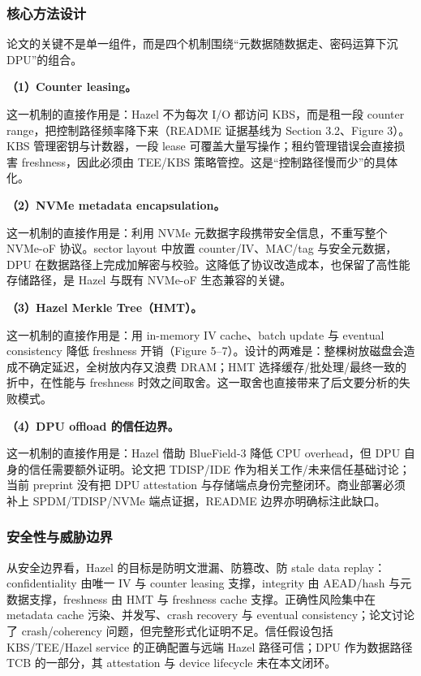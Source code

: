 \documentclass[11pt]{ctexart}
\begin{document}
\subsubsection{核心方法设计}
论文的关键不是单一组件，而是四个机制围绕“元数据随数据走、密码运算下沉 DPU”的组合。\par
\noindent\textbf{（1）Counter leasing。}\par
这一机制的直接作用是：Hazel 不为每次 I/O 都访问 KBS，而是租一段 counter range，把控制路径频率降下来（README 证据基线为 Section 3.2、Figure 3）。KBS 管理密钥与计数器，一段 lease 可覆盖大量写操作；租约管理错误会直接损害 freshness，因此必须由 TEE/KBS 策略管控。这是“控制路径慢而少”的具体化。\par
\noindent\textbf{（2）NVMe metadata encapsulation。}\par
这一机制的直接作用是：利用 NVMe 元数据字段携带安全信息，不重写整个 NVMe-oF 协议。sector layout 中放置 counter/IV、MAC/tag 与安全元数据，DPU 在数据路径上完成加解密与校验。这降低了协议改造成本，也保留了高性能存储路径，是 Hazel 与既有 NVMe-oF 生态兼容的关键。\par
\noindent\textbf{（3）Hazel Merkle Tree（HMT）。}\par
这一机制的直接作用是：用 in-memory IV cache、batch update 与 eventual consistency 降低 freshness 开销（Figure 5--7）。设计的两难是：整棵树放磁盘会造成不确定延迟，全树放内存又浪费 DRAM；HMT 选择缓存/批处理/最终一致的折中，在性能与 freshness 时效之间取舍。这一取舍也直接带来了后文要分析的失败模式。\par
\noindent\textbf{（4）DPU offload 的信任边界。}\par
这一机制的直接作用是：Hazel 借助 BlueField-3 降低 CPU overhead，但 DPU 自身的信任需要额外证明。论文把 TDISP/IDE 作为相关工作/未来信任基础讨论；当前 preprint 没有把 DPU attestation 与存储端点身份完整闭环。商业部署必须补上 SPDM/TDISP/NVMe 端点证据，README 边界亦明确标注此缺口。\par
\subsubsection{安全性与威胁边界}
从安全边界看，Hazel 的目标是防明文泄漏、防篡改、防 stale data replay：confidentiality 由唯一 IV 与 counter leasing 支撑，integrity 由 AEAD/hash 与元数据支撑，freshness 由 HMT 与 freshness cache 支撑。正确性风险集中在 metadata cache 污染、并发写、crash recovery 与 eventual consistency；论文讨论了 crash/coherency 问题，但完整形式化证明不足。信任假设包括 KBS/TEE/Hazel service 的正确配置与远端 Hazel 路径可信；DPU 作为数据路径 TCB 的一部分，其 attestation 与 device lifecycle 未在本文闭环。\par
\end{document}
